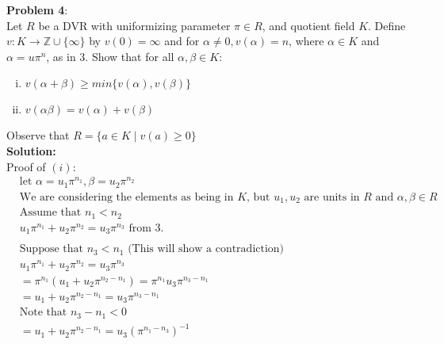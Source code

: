\documentclass[11pt]{article}
\newcommand{\prob}[3]{\begin{flushleft}
        \textbf{Problem #1}: \\
        #2 
		\textbf{Solution:} 
		#3

\end{flushleft}}
\begin{document}
\prob{4}{
  Let $R$ be a DVR with uniformizing parameter $\pi \in R$, and quotient field $K$. Define $v : K \rightarrow \mathbb{Z} \cup \{ \infty \}$ by $v(0) = \infty$ and for $\alpha \neq 0, v(\alpha) =n$, where $\alpha \in K$ and $\alpha = u \pi^n$, as in 3. Show that for all $\alpha, \beta \in K$:
  \begin{enumerate}[(i)]
    \item $v(\alpha + \beta) \geq min\{ v(\alpha), v(\beta) \}$
    \item $v(\alpha \beta) = v(\alpha) + v(\beta)$
  \end{enumerate}
  Observe that $R = \{ a \in K \mid v(a) \geq 0 \}$ \\
}{ \\
  Proof of $(i)$:
  \newline
  \begin{align*}
     & \text{let } \alpha = u_1 \pi ^ {n_1}, \beta = u_2 \pi ^{n_2}                                                      \\
     & \text{We are considering the elements as being in $K$, but $u_1, u_2$ are units in $R$ and $\alpha, \beta \in R$} \\
     & \text{Assume that $n_1 < n_2$}                                                                                    \\
     & u_1 \pi ^ {n_1} + u_2 \pi ^{n_2} = u_3 \pi ^ {n_3} \text{ from 3.}                                                \\
     &                                                                                                                   \\
     & \text{Suppose that $n_3 < n_1$ (This will show a contradiction)}                                                  \\
     & u_1 \pi ^ {n_1} + u_2 \pi ^{n_2} = u_3 \pi ^{ n_3}                                                                \\
     & = \pi ^ {n_1}(u_1 + u_2 \pi ^{n_2-n_1}) = \pi ^{n_1} u_3 \pi ^ {n_3-n_1}                                          \\
     & = u_1 + u_2 \pi ^{n_2-n_1} = u_3 \pi ^ {n_3-n_1}                                                                  \\
     & \text{Note that $n_3-n_1 < 0$}                                                                                    \\
     & = u_1 + u_2 \pi ^{n_2-n_1} = u_3 \left( \pi ^ {n_1-n_3} \right)^{-1}                                              \\

\end{align*}}
\end{document}

